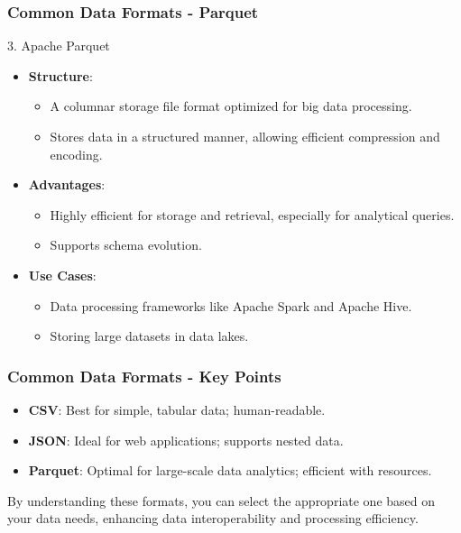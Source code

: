 \documentclass[aspectratio=169]{beamer}
\begin{document}
\begin{frame}[fragile]
    \frametitle{Common Data Formats - Parquet}
    \begin{block}{3. Apache Parquet}
        \begin{itemize}
            \item \textbf{Structure}:
            \begin{itemize}
                \item A columnar storage file format optimized for big data processing.
                \item Stores data in a structured manner, allowing efficient compression and encoding.
            \end{itemize}

            \item \textbf{Advantages}:
            \begin{itemize}
                \item Highly efficient for storage and retrieval, especially for analytical queries.
                \item Supports schema evolution.
            \end{itemize}

            \item \textbf{Use Cases}:
            \begin{itemize}
                \item Data processing frameworks like Apache Spark and Apache Hive.
                \item Storing large datasets in data lakes.
            \end{itemize}
        \end{itemize}
    \end{block}
\end{frame}

\begin{frame}
    \frametitle{Common Data Formats - Key Points}
    \begin{itemize}
        \item \textbf{CSV}: Best for simple, tabular data; human-readable.
        \item \textbf{JSON}: Ideal for web applications; supports nested data.
        \item \textbf{Parquet}: Optimal for large-scale data analytics; efficient with resources.
    \end{itemize}
    By understanding these formats, you can select the appropriate one based on your data needs, enhancing data interoperability and processing efficiency.
\end{frame}
\end{document}
